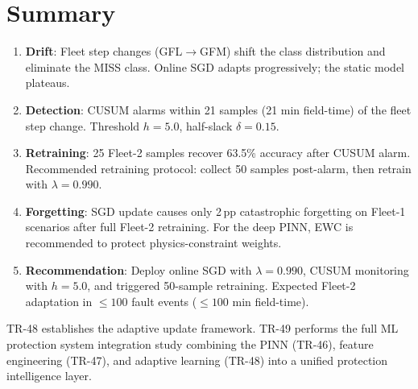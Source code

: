 \documentclass[11pt,a4paper]{article}
\begin{document}
\section{Summary}
\label{sec:summary}

\begin{enumerate}
  \item \textbf{Drift}: Fleet step changes (GFL$\to$GFM) shift the class
    distribution and eliminate the MISS class.  Online SGD adapts
    progressively; the static model plateaus.

  \item \textbf{Detection}: CUSUM alarms within 21 samples (21 min field-time)
    of the fleet step change.  Threshold $h=5.0$, half-slack $\delta=0.15$.

  \item \textbf{Retraining}: 25 Fleet-2 samples recover 63.5\% accuracy after
    CUSUM alarm.  Recommended retraining protocol: collect 50 samples
    post-alarm, then retrain with $\lambda=0.990$.

  \item \textbf{Forgetting}: SGD update causes only 2\,pp catastrophic
    forgetting on Fleet-1 scenarios after full Fleet-2 retraining.  For the
    deep PINN, EWC is recommended to protect physics-constraint weights.

  \item \textbf{Recommendation}: Deploy online SGD with $\lambda=0.990$,
    CUSUM monitoring with $h=5.0$, and triggered 50-sample retraining.
    Expected Fleet-2 adaptation in $\leq100$ fault events ($\leq100$ min
    field-time).
\end{enumerate}

\noindent
TR-48 establishes the adaptive update framework.  TR-49 performs the full ML
protection system integration study combining the PINN (TR-46), feature
engineering (TR-47), and adaptive learning (TR-48) into a unified protection
intelligence layer.



\end{document}
